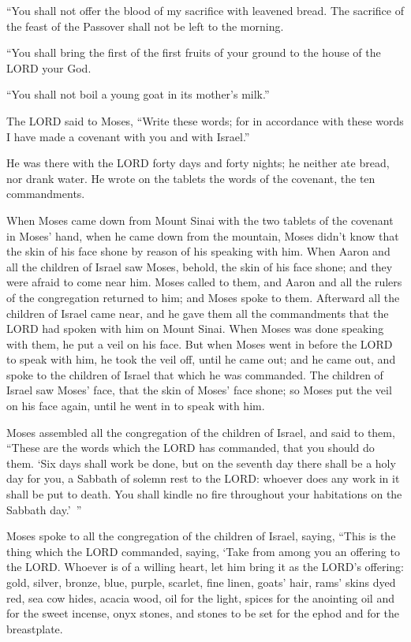 \myverse{}“You shall not offer the blood of my sacrifice with leavened
bread. The sacrifice of the feast of the Passover shall not be left to the morning.


\myverse{}“You shall bring the first of the first fruits of your ground
to the house of the LORD your God.

“You shall not boil a young goat in its mother’s milk.”


\myverse{}The LORD said to Moses, “Write these words; for in accordance
with these words I have made a covenant with you and with Israel.”


\myverse{}He was there with the LORD forty days and forty nights; he neither
ate bread, nor drank water. He wrote on the tablets the words of the covenant, the ten commandments.


\myverse{}When Moses came down from Mount Sinai with the two tablets of
the covenant in Moses’ hand, when he came down from the mountain, Moses didn’t know that the skin of his
face shone by reason of his speaking with him.
\myverse{}When Aaron and all the children of Israel saw Moses, behold, the skin of
his face shone; and they were afraid to come near him.
\myverse{}Moses called to them, and Aaron and all the rulers of the congregation returned
to him; and Moses spoke to them.
\myverse{}Afterward all the children of Israel came near, and he gave them all the
commandments that the LORD had spoken with him on Mount Sinai.
\myverse{}When Moses was done speaking with them, he put a veil on his face.
\myverse{}But when Moses went in before the LORD to speak with him, he took the veil
off, until he came out; and he came out, and spoke to the children of Israel that which he was commanded.
\myverse{}The children of Israel saw Moses’ face, that the skin of Moses’ face shone;
so Moses put the veil on his face again, until he went in to speak with him.


\mychapter{} \myverse*{}Moses assembled all the congregation of the children of Israel,
and said to them, “These are the words which the LORD has commanded, that you should do them.
\myverse{}‘Six days shall work be done, but on the seventh day there shall be a holy
day for you, a Sabbath of solemn rest to the LORD: whoever does any work in it shall be put to death.
\myverse{}You shall kindle no fire throughout your habitations on the Sabbath day.’ ”


\myverse{}Moses spoke to all the congregation of the children of Israel,
saying, “This is the thing which the LORD commanded, saying,
\myverse{}‘Take from among you an offering to the LORD. Whoever is of a willing heart,
let him bring it as the LORD’s offering: gold, silver, bronze,
\myverse{}blue, purple, scarlet, fine linen, goats’ hair,
\myverse{}rams’ skins dyed red, sea cow hides, acacia wood,
\myverse{}oil for the light, spices for the anointing oil and for the sweet incense,
\myverse{}onyx stones, and stones to be set for the ephod and for the breastplate.


